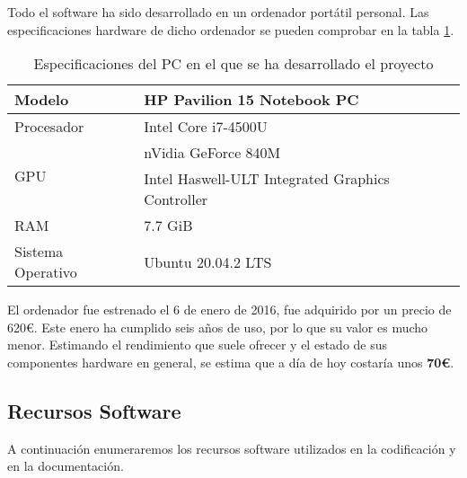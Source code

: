 Todo el software ha sido desarrollado en un ordenador portátil personal. Las especificaciones hardware de dicho ordenador se pueden comprobar en la tabla \ref{tabla:especificaciones-PC}.
\begin{table}[ht]
    \centering
    \begin{tabular}{ll}
    \hline
    Modelo                           & HP Pavilion 15 Notebook PC                       \\ \hline
    Procesador                       & Intel Core i7-4500U                              \\ \hline
    \multirow{2}{*}{GPU} & nVidia GeForce 840M                              \\
                                     & Intel Haswell-ULT Integrated Graphics Controller \\ \hline
    RAM                              & 7.7 GiB                                          \\ \hline
    Sistema Operativo                & Ubuntu 20.04.2 LTS                               \\ \hline
    \end{tabular}
    \caption{Especificaciones del PC en el que se ha desarrollado el proyecto}
    \label{tabla:especificaciones-PC}
    \end{table}


El ordenador fue estrenado el 6 de enero de 2016, fue adquirido por un precio de 620€. Este enero ha cumplido seis años de uso, por lo que su valor es mucho menor. Estimando el rendimiento que suele ofrecer y el estado de sus componentes hardware en general, se estima que a día de hoy costaría unos \textbf{70€}.

\subsection*{Recursos Software}

A continuación enumeraremos los recursos software utilizados en la codificación y en la documentación.

